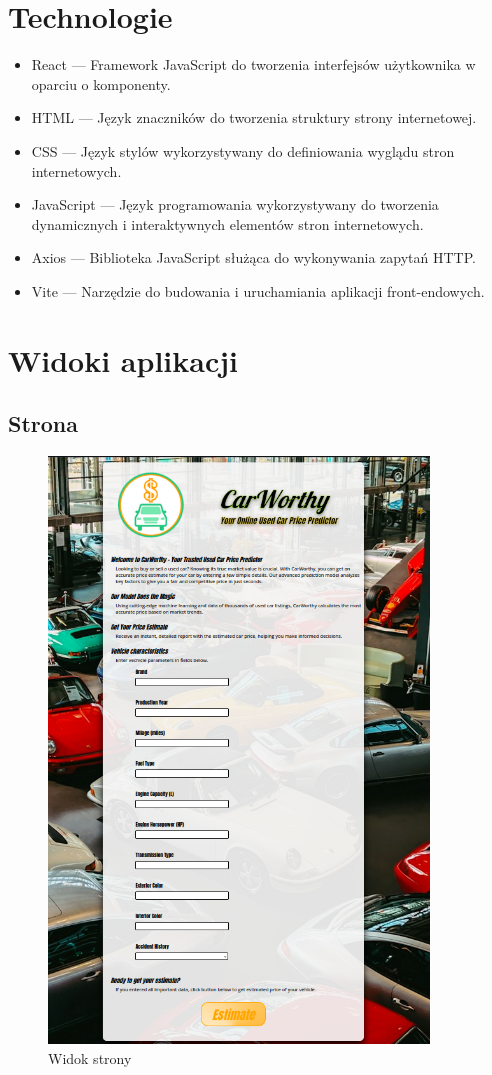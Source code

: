 \documentclass[12pt, a4paper]{report}
\begin{document}
\section{Technologie}
\begin{itemize}
    \item React --- Framework JavaScript do tworzenia interfejsów użytkownika w oparciu o komponenty.
    \item HTML --- Język znaczników do tworzenia struktury strony internetowej.
    \item CSS --- Język stylów wykorzystywany do definiowania wyglądu stron internetowych.
    \item JavaScript --- Język programowania wykorzystywany do tworzenia dynamicznych i interaktywnych elementów stron internetowych.
    \item Axios --- Biblioteka JavaScript służąca do wykonywania zapytań HTTP.\@
    \item Vite --- Narzędzie do budowania i uruchamiania aplikacji front-endowych. 
\end{itemize}
\newpage
\section{Widoki aplikacji}
\subsection{Strona}
\begin{figure}[H]
    \centering
    \includegraphics[width=0.9\textwidth]{images/page_view}
    \caption{Widok strony}
\end{figure}
\end{document}
